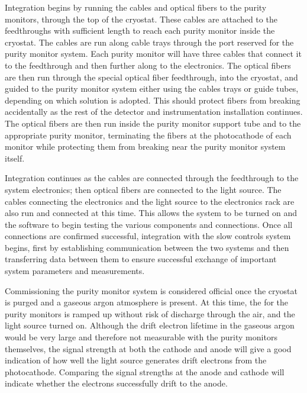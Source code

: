 Integration %
begins by running the   cables and optical fibers to the purity monitors, through the top of the cryostat.  These cables %
are attached to the    feedthroughs with sufficient length to reach each purity monitor inside the cryostat.  
The cables %
are run along cable trays through the port reserved for the purity monitor system. 
Each purity monitor will have three   cables that connect it to the feedthrough and then further along to the   electronics.  The optical fibers %
are then run through the special optical fiber feedthrough, into the cryostat, and %
guided to the purity monitor system either using the cables trays or guide tubes, depending on which solution is adopted. 
This should protect fibers from breaking accidentally as the rest of the detector and instrumentation installation continues.  The optical fibers %
are then run inside the purity monitor support tube and to the appropriate purity monitor, terminating the fibers at the photocathode of each monitor while protecting them from breaking near the purity monitor system itself.

Integration %
continues as the   cables are connected through the feedthrough to the system   electronics; then optical fibers are connected to the light source.  The cables connecting the  electronics and the light source to the electronics rack %
are also run and connected at this time.  This allows the system to be turned on and the software to begin testing the various components and connections.  Once all connections are confirmed successful, integration with the slow controls system begins, first by establishing communication between the two systems and then transferring data between them to ensure successful exchange of important system parameters and measurements.  

Commissioning the purity monitor system is considered %
 official once the cryostat is purged and a gaseous argon atmosphere is present.  At this time, the  for the purity monitors %
  is ramped up without risk of discharge through the air, and the light source turned on.  Although the drift electron lifetime in the gaseous argon would be very large and therefore not %
  measurable with the purity monitors themselves, the signal strength at both the cathode and anode will %
  give a good indication of how well the light source generates drift electrons from the photocathode. %
 Comparing the signal strengths at the anode and cathode will indicate whether the electrons successfully drift to the anode.

